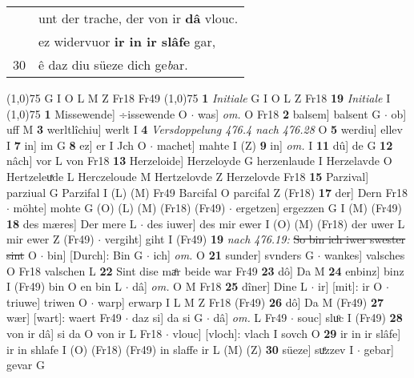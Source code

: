 \documentclass[8pt,a4paper,notitlepage]{article}
\begin{document}
\begin{table}[ht]
\begin{minipage}[t]{0.5\linewidth}
\begin{tabular}{rl}
 & unt der trache, der von ir \textbf{dâ} vlouc.\\ 
 & ez widervuor \textbf{ir in ir slâfe} gar,\\ 
30 & ê daz diu süeze dich ge\textit{b}ar.\\ 
\end{tabular}
\scriptsize
\line(1,0){75} \newline
G I O L M Z Fr18 Fr49 \newline
\line(1,0){75} \newline
\textbf{1} \textit{Initiale} G I O L Z Fr18  \textbf{19} \textit{Initiale} I  \newline
\line(1,0){75} \newline
\textbf{1} Missewende] ÷issewende O  $\cdot$ was] \textit{om.} O Fr18 \textbf{2} balsem] balsent G  $\cdot$ ob] uff M \textbf{3} werltlîchiu] werlt I \textbf{4} \textit{Versdoppelung 476.4 nach 476.28} O  \textbf{5} werdiu] ellev I \textbf{7} in] im G \textbf{8} ez] er I Jch O  $\cdot$ machet] mahte I (Z) \textbf{9} in] \textit{om.} I \textbf{11} dû] de G \textbf{12} nâch] vor L von Fr18 \textbf{13} Herzeloide] Herzeloyde G herzenlaude I Herzelavde O Hertzeleuͯde L Herczeloude M Hertzelovde Z Herzelovde Fr18 \textbf{15} Parzival] parziual G Parzifal I (L) (M) Fr49 Barcifal O parcifal Z (Fr18) \textbf{17} der] Dern Fr18  $\cdot$ möhte] mohte G (O) (L) (M) (Fr18) (Fr49)  $\cdot$ ergetzen] ergezzen G I (M) (Fr49) \textbf{18} des mæres] Der mere L  $\cdot$ des iuwer] des mir ewer I (O) (M) (Fr18) der uwer L mir ewer Z (Fr49)  $\cdot$ vergiht] giht I (Fr49) \textbf{19} \textit{nach 476.19:} \sout{So bin ich iwer swester sint} O   $\cdot$ bin] [Durch]: Bin G  $\cdot$ ich] \textit{om.} O \textbf{21} sunder] svnders G  $\cdot$ wankes] valsches O Fr18 valschen L \textbf{22} Sint dise maͤr beide war Fr49 \textbf{23} dô] Da M \textbf{24} enbinz] binz I (Fr49) bin O en bin L  $\cdot$ dâ] \textit{om.} O M Fr18 \textbf{25} dîner] Dine L  $\cdot$ ir] [mit]: ir O  $\cdot$ triuwe] triwen O  $\cdot$ warp] erwarp I L M Z Fr18 (Fr49) \textbf{26} dô] Da M (Fr49) \textbf{27} wær] [wart]: waert Fr49  $\cdot$ daz si] da si G  $\cdot$ dâ] \textit{om.} L Fr49  $\cdot$ souc] sluͦc I (Fr49) \textbf{28} von ir dâ] si da O von ir L Fr18  $\cdot$ vlouc] [vloch]: vlach I sovch O \textbf{29} ir in ir slâfe] ir in shlafe I (O) (Fr18) (Fr49) in slaffe ir L (M) (Z) \textbf{30} süeze] suͤzzev I  $\cdot$ gebar] gevar G \newline
\end{minipage}
\hspace{0.5cm}
\begin{minipage}[t]{0.5\linewidth}

\end{minipage}
\end{table}
\end{document}
